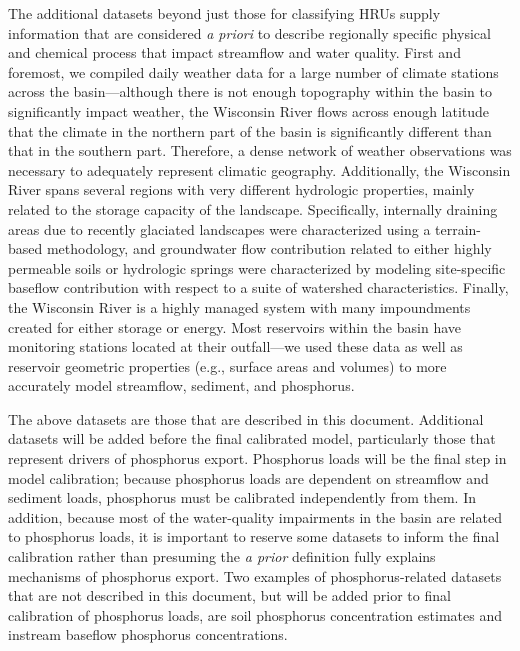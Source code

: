 The additional datasets beyond just those for classifying HRUs supply information that are considered \textit{a priori} to describe regionally specific physical and chemical process that impact streamflow and water quality. First and foremost, we compiled daily weather data for a large number of climate stations across the basin---although there is not enough topography within the basin to significantly impact weather, the Wisconsin River flows across enough latitude that the climate in the northern part of the basin is significantly different than that in the southern part. Therefore, a dense network of weather observations was necessary to adequately represent climatic geography. Additionally, the Wisconsin River spans several regions with very different hydrologic properties, mainly related to the storage capacity of the landscape. Specifically, internally draining areas due to recently glaciated landscapes were characterized using a terrain-based methodology, and groundwater flow contribution related to either highly permeable soils or hydrologic springs were characterized by modeling site-specific baseflow contribution with respect to a suite of watershed characteristics. Finally, the Wisconsin River is a highly managed system with many impoundments created for either storage or energy. Most reservoirs within the basin have monitoring stations located at their outfall---we used these data as well as reservoir geometric properties (e.g., surface areas and volumes) to more accurately model streamflow, sediment, and phosphorus.

The above datasets are those that are described in this document. Additional datasets will be added before the final calibrated model, particularly those that represent drivers of phosphorus export. Phosphorus loads will be the final step in model calibration; because phosphorus loads are dependent on streamflow and sediment loads, phosphorus must be calibrated independently from them. In addition, because most of the water-quality impairments in the basin are related to phosphorus loads, it is important to reserve some datasets to inform the final calibration rather than presuming the \textit{a prior} definition fully explains mechanisms of phosphorus export. Two examples of phosphorus-related datasets that are not described in this document, but will be added prior to final calibration of phosphorus loads, are soil phosphorus concentration estimates and instream baseflow phosphorus concentrations.

